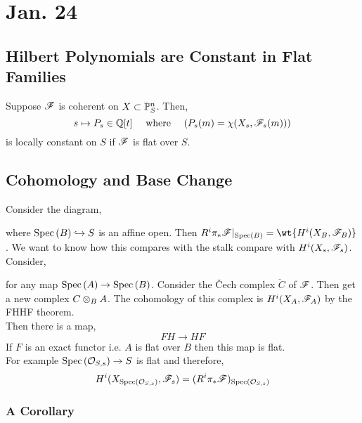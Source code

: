 \documentclass[12pt]{article}
\begin{document}
\section{Jan. 24}

\subsection{Hilbert Polynomials are Constant in Flat Families}

Suppose $\F$ is coherent on $X \subset \P^n_S$. Then,
\[ s \mapsto P_s \in \Q[t] \quad \text{ where } \quad (P_s(m) = \chi(X_s, \F_s(m)))\]
is locally constant on $S$ if $\F$ is flat over $S$. 

\subsection{Cohomology and Base Change}

Consider the diagram,
\begin{center}
\end{center}
where $\Spec{B} \embed S$ is an affine open. Then $R^i \pi_* \F |_{\Spec{B}} = \wt{H^i(X_B, \F_B)}$. We want to know how this compares with the stalk compare with $H^i(X_s, \F_s)$.
\bigskip\\
Consider,
\begin{center}
\end{center}
for any map $\Spec{A} \to \Spec{B}$. Consider the \v{C}ech complex $\check{C}$ of $\F$. Then get a new complex $C \ot_B A$. The cohomology of this complex is $H^i(X_A, \F_A)$ by the FHHF theorem. 
\bigskip\\
Then there is a map,
\[ F H \to H F \]
If $F$ is an exact functor i.e. $A$ is flat over $B$ then this map is flat.
\bigskip\\
For example $\Spec{\stalk{S}{s}} \to S$ is flat and therefore,
\[ H^i(X_{\Spec{\stalk{S}{s}}}, \F_s) = (R^i \pi_* \F)_{\Spec{\stalk{S}{s}}} \] 


\subsubsection{A Corollary}
\end{document}

